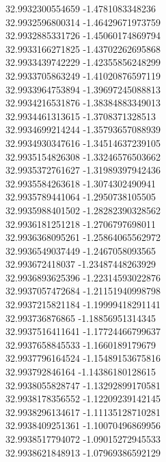 {32.9932300554659	-1.4781083348236\\
32.9932596800314	-1.46429671973759\\
32.9932885331726	-1.45060174869794\\
32.9933166271825	-1.43702262695868\\
32.9933439742229	-1.42355856248299\\
32.9933705863249	-1.41020876597119\\
32.9933964753894	-1.39697245088813\\
32.9934216531876	-1.38384883349013\\
32.9934461313615	-1.3708371328513\\
32.9934699214244	-1.35793657088939\\
32.9934930347616	-1.34514637239105\\
32.9935154826308	-1.33246576503662\\
32.9935372761627	-1.31989397942436\\
32.9935584263618	-1.3074302490941\\
32.9935789441064	-1.2950738105505\\
32.9935988401502	-1.28282390328562\\
32.9936181251218	-1.2706797698011\\
32.9936368095261	-1.25864065562972\\
32.9936549037449	-1.2467058093565\\
32.993672418037	-1.23487448263929\\
32.9936893625396	-1.22314593022876\\
32.9937057472684	-1.21151940998798\\
32.9937215821184	-1.19999418291141\\
32.993736876865	-1.18856951314345\\
32.9937516411641	-1.17724466799637\\
32.9937658845533	-1.1660189179679\\
32.9937796164524	-1.15489153675816\\
32.993792846164	-1.14386180128615\\
32.9938055828747	-1.13292899170581\\
32.9938178356552	-1.12209239142145\\
32.9938296134617	-1.11135128710281\\
32.9938409251361	-1.10070496869956\\
32.9938517794072	-1.09015272945533\\
32.9938621848913	-1.07969386592129\\
}
